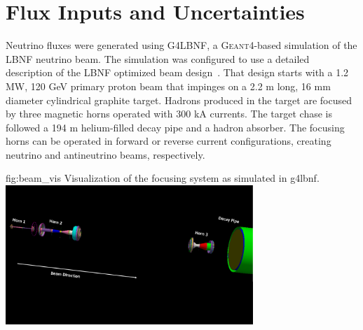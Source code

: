 \section{Flux Inputs and Uncertainties}\label{sec:nu-osc-05}
\label{sec:physics-lbnosc-flux}

Neutrino fluxes were generated using G4LBNF, a \textsc{Geant}4\xspace-based simulation of the LBNF neutrino beam.  The simulation was configured to use a detailed description of the LBNF optimized beam design~\cite{optimizedbeamcdr}.  That design starts with a 1.2 MW, 120 GeV primary proton beam that impinges on a 2.2 m long, 16 mm diameter cylindrical graphite target.  Hadrons produced in the target are focused by three magnetic horns operated with 300 kA currents.  The target chase is followed a 194 m helium-filled decay pipe and a hadron absorber.  The focusing horns can be operated in forward or reverse current configurations, creating neutrino and antineutrino beams, respectively.   

\begin{dunefigure}{fig:beam_vis}
{Visualization of the focusing system as simulated in g4lbnf.}
    \includegraphics[width=0.7\textwidth]{graphics/Beamline_optimized_sept2017.pdf}\end{dunefigure}


